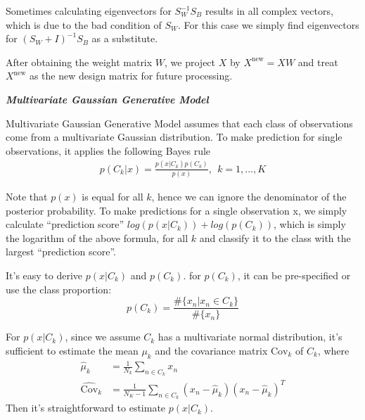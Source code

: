 \documentclass[12pt,oneside,a4paper]{article}
\newcommand{\Cov}[0]{\mathrm{Cov}}
\begin{document}
Sometimes calculating eigenvectors for $S_{W}^{-1}S_{B}$ results in all complex vectors, which is due to the bad condition of $S_{W}$. For this case we simply find eigenvectors for $(S_{W} + I)^{-1}S_{B}$ as a substitute.

After obtaining the weight matrix $W$, we project $X$ by $X^{\mathrm{new}} = XW$ and treat $X^{\mathrm{new}}$ as the new design matrix for future processing.

\vspace{2em}
\textbf{\em Multivariate Gaussian Generative Model}

Multivariate Gaussian Generative Model assumes that each class of observations come from a multivariate Gaussian distribution. To make prediction for single observations, it applies the following Bayes rule
\begin{equation*}
\begin{aligned}
    p(C_{k}|x) = \frac{p(x|C_{k})p(C_{k})}{p(x)}, ~~ k = 1, \dots, K
\end{aligned}
\end{equation*}

Note that $p(x)$ is equal for all $k$, hence we can ignore the denominator of the posterior probability. To make predictions for a single observation x, we simply calculate ``prediction score'' $log(p(x|C_{k})) + log(p(C_{k}))$, which is simply the logarithm of the above formula, for all $k$ and classify it to the class with the largest ``prediction score''.

It's easy to derive $p(x|C_{k})$ and $p(C_{k})$. for $p(C_{k})$, it can be pre-specified or use the class proportion:
\begin{equation*}
    p(C_{k}) = \frac{\#\{x_{n} | x_{n} \in C_{k}\}}{\#\{x_{n}\}}
\end{equation*}

For $p(x|C_{k})$, since we assume $C_{k}$ has a multivariate normal distribution, it's sufficient to estimate the mean $\mu_{k}$ and the covariance matrix $\Cov_{k}$ of $C_{k}$, where
\begin{equation*}
\begin{aligned}
    \hat{\mu}_{k} &= \frac{1}{N_{k}}\sum_{n \in C_{k}}{x_{n}}\\
    \hat{\Cov}_{k} &= \frac{1}{N_{K} - 1}\sum_{n \in C_{k}}{(x_{n} - \hat{\mu}_{k})(x_{n} - \hat{\mu}_{k})^{T}}
\end{aligned}
\end{equation*}
Then it's straightforward to estimate $p(x|C_{k})$.
\end{document}
